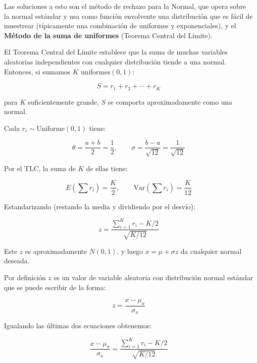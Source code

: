 \documentclass{article}
\begin{document}
Las soluciones a esto son el método de rechazo para la Normal, que opera sobre la normal
estándar y usa como función envolvente una distribución que es fácil de muestrear
(típicamente una combinación de uniformes y exponenciales), y el \textbf{Método de la suma de
uniformes} (Teorema Central del Límite).

El Teorema Central del Límite establece que la suma de muchas variables aleatorias
independientes con cualquier distribución tiende a una normal. Entonces, si sumamos $K$
uniformes$(0,1)$:

\begin{equation}
    S = r_1 + r_2 + \cdots + r_K
\end{equation}

para $K$ suficientemente grande, $S$ se comporta aproximadamente como una normal.

Cada $r_i \sim \mathrm{Uniforme}(0,1)$ tiene:

\begin{equation}
    \theta = \frac{a + b}{2} = \frac{1}{2}, \qquad \sigma = \frac{b - a}{\sqrt{12}} = \frac{1}{\sqrt{12}}
\end{equation}

Por el TLC, la suma de $K$ de ellas tiene:

\begin{equation}
    E\!\left(\sum r_i\right) = \frac{K}{2}, \qquad \mathrm{Var}\!\left(\sum r_i\right) = \frac{K}{12}
\end{equation}

Estandarizando (restando la media y dividiendo por el desvío):

\begin{equation}
    z = \frac{\displaystyle\sum_{i=1}^{K} r_i - K/2}{\sqrt{K/12}}
\end{equation}

Este $z$ es aproximadamente $N(0,1)$, y luego $x = \mu + \sigma z$ da cualquier normal deseada.

Por definición $z$ es un valor de variable aleatoria con distribución normal estándar que se
puede escribir de la forma:

\begin{equation}
    z = \frac{x - \mu_x}{\sigma_x}
\end{equation}

Igualando las últimas dos ecuaciones obtenemos:

\begin{equation}
    \frac{x - \mu_x}{\sigma_x} = \frac{\displaystyle\sum_{i=1}^{K} r_i - K/2}{\sqrt{K/12}}
\end{equation}
\end{document}
